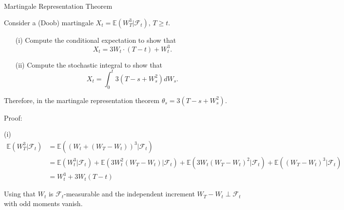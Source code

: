 \documentclass{beamer}
\begin{document}
\begin{frame}{Martingale Representation Theorem}

    {\footnotesize \footnotesize
    \par Consider a (Doob) martingale $X_t = \mathbb{E}(W_T^3 | \mathcal{F}_t), \, T \geq t$.
    \begin{itemize}
    \item[(i)] Compute the conditional expectation to show that  
    \[
    X_t = 3W_t \cdot (T - t) + W_t^3.
    \]
    
    \item[(ii)] Compute the stochastic integral to show that  
    \[
    X_t = \int_0^t 3(T - s + W_s^2) dW_s.
    \]
    \end{itemize}

    \par Therefore, in the martingale representation theorem $\theta_s = 3(T - s + W_s^2)$.
    \par  \pause Proof:
    \par (i)
    {\footnotesize \tiny
    \begin{align*}
         \mathbb{E}(W_T^3 | \mathcal{F}_t) & = \mathbb{E}((W_t + (W_T-W_t))^3 | \mathcal{F}_t)\\
         & = \mathbb{E}(W_t ^3 | \mathcal{F}_t) + \mathbb{E}(3W_t^2(W_T-W_t) | \mathcal{F}_t)
         + \mathbb{E}(3W_t(W_T-W_t)^2 | \mathcal{F}_t) + \mathbb{E}((W_T-W_t) ^3 | \mathcal{F}_t)\\
         &= W_t^3 + 3W_t (T - t)
    \end{align*}
    }
    \par Using that $W_t$ is $\mathcal{F}_t$-measurable and the independent increment $W_T - W_t \perp \mathcal{F}_t$ 
    with odd moments vanish.
    }

\end{frame} 
\end{document}
